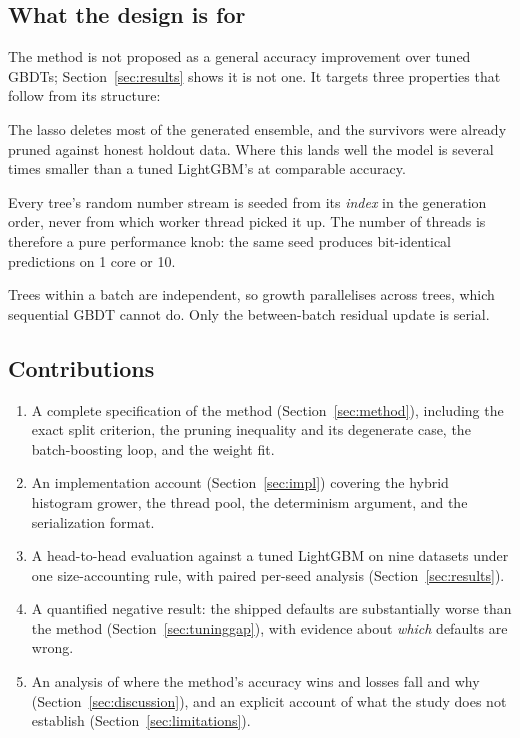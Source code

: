 \documentclass[11pt,a4paper]{article}
\theoremstyle{definition}
\begin{document}
\subsection{What the design is for}

The method is not proposed as a general accuracy improvement over tuned GBDTs;
Section~\ref{sec:results} shows it is not one. It targets three properties that
follow from its structure:

\begin{description}[leftmargin=1.5em,style=nextline]
\item[Model size.] The lasso deletes most of the generated ensemble, and the
survivors were already pruned against honest holdout data. Where this lands
well the model is several times smaller than a tuned LightGBM's at comparable
accuracy.
\item[Reproducibility.] Every tree's random number stream is seeded from its
\emph{index} in the generation order, never from which worker thread picked it
up. The number of threads is therefore a pure performance knob: the same seed
produces bit-identical predictions on 1 core or 10.
\item[Parallel structure.] Trees within a batch are independent, so growth
parallelises across trees, which sequential GBDT cannot do. Only the
between-batch residual update is serial.
\end{description}

\subsection{Contributions}

\begin{enumerate}[leftmargin=*,itemsep=2pt]
\item A complete specification of the method (Section~\ref{sec:method}),
including the exact split criterion, the pruning inequality and its degenerate
case, the batch-boosting loop, and the weight fit.
\item An implementation account (Section~\ref{sec:impl}) covering the hybrid
histogram grower, the thread pool, the determinism argument, and the
serialization format.
\item A head-to-head evaluation against a tuned LightGBM on nine datasets under
one size-accounting rule, with paired per-seed analysis
(Section~\ref{sec:results}).
\item A quantified negative result: the shipped defaults are substantially
worse than the method (Section~\ref{sec:tuninggap}), with evidence about
\emph{which} defaults are wrong.
\item An analysis of where the method's accuracy wins and losses fall and why
(Section~\ref{sec:discussion}), and an explicit account of what the study does
not establish (Section~\ref{sec:limitations}).
\end{enumerate}
\end{document}
